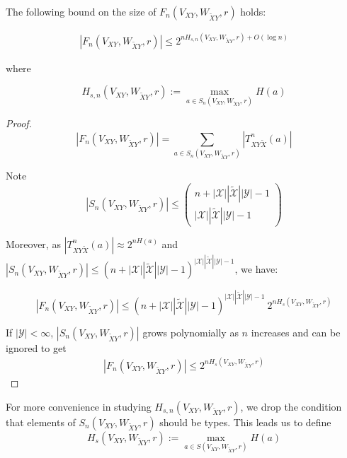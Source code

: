 \begin{lem}\label{lem: F_n}
 The following bound on the size of $F_n(V_{XY},W_{\tilde{X}Y},r)$ holds:

\begin{align*}
| F_n(V_{XY},W_{\tilde{X}Y},r) | \leq 2^{nH_{s,n}(V_{XY},W_{\tilde{X}Y},r)+O(\log n)}
\end{align*}

where

\begin{equation*}
H_{s,n}(V_{XY},W_{\tilde{X}Y},r):= \max_{a\in S_n(V_{XY},W_{\tilde{X}Y},r)} H(a)
\end{equation*}
\end{lem}

\begin{proof}
\begin{equation*}
| F_n(V_{XY},W_{\tilde{X}Y},r) | =\sum_{a\in S_n(V_{XY},W_{\tilde{X}Y},r)} |T_{XY\tilde{X}}^n(a)|
\end{equation*}

Note 
\begin{equation*}
|S_n(V_{XY},W_{\tilde{X}Y},r)| \leq \begin{pmatrix}
n+|\mathcal{X}||\tilde{\mathcal{X}}||\mathcal{Y}|-1 \\ |\mathcal{X}||\tilde{\mathcal{X}}||\mathcal{Y}|-1 
\end{pmatrix}
\end{equation*}

Moreover, as $|T_{XY\tilde{X}}^n(a)| \approx 2^{nH(a)}$ and $|S_n(V_{XY},W_{\tilde{X}Y},r)| \leq (n+|\mathcal{X}||\tilde{\mathcal{X}}||\mathcal{Y}|-1)^{|\mathcal{X}||\tilde{\mathcal{X}}||\mathcal{Y}|-1} $, we have:

\begin{equation*}
| F_n(V_{XY},W_{\tilde{X}Y},r) | \leq (n+|\mathcal{X}||\tilde{\mathcal{X}}||\mathcal{Y}|-1)^{|\mathcal{X}||\tilde{\mathcal{X}}||\mathcal{Y}|-1}  ~2^{nH_s(V_{XY},W_{\tilde{X}Y},r)}
\end{equation*}


If $|\mathcal{Y}|< \infty$, $|S_n(V_{XY},W_{\tilde{X}Y},r)|$ grows polynomially as $n$ increases and can be ignored to get
\begin{align*}
| F_n(V_{XY},W_{\tilde{X}Y},r) | \leq 2^{nH_s(V_{XY},W_{\tilde{X}Y},r)}
\end{align*}

\end{proof}

For more convenience in studying $H_{s,n}(V_{XY},W_{\tilde{X}Y},r)$, we drop the condition that elements of $S_n(V_{XY},W_{\tilde{X}Y},r)$ should be types. This leads us to define 
\begin{equation}\label{equ: H_S_S}
H_{s}(V_{XY},W_{\tilde{X}Y},r):= \max_{a\in S(V_{XY},W_{\tilde{X}Y},r)} H(a)
\end{equation}


